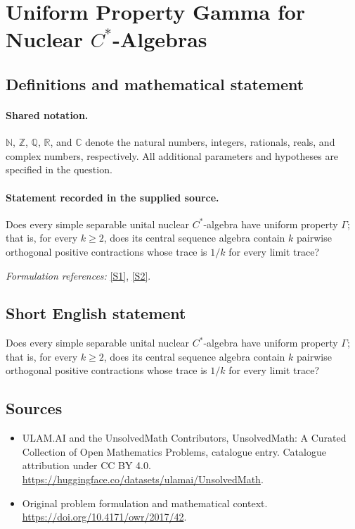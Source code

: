\documentclass[11pt]{article}
\newcommand{\sref}[2]{\hyperlink{source:#1:#2}{[S#2]}}
\begin{document}
\section{\texorpdfstring{Uniform Property Gamma for Nuclear $C^*$-Algebras}{Uniform Property Gamma for Nuclear C\textasciicircum{}*-Algebras}}\label{statement}

\subsection{Definitions and mathematical statement}

\paragraph{Shared notation.}$\mathbb N$, $\mathbb Z$, $\mathbb Q$, $\mathbb R$, and $\mathbb C$ denote the natural numbers, integers, rationals, reals, and complex numbers, respectively. All additional parameters and hypotheses are specified in the question.


\paragraph{Statement recorded in the supplied source.}
Does every simple separable unital nuclear $C^*$-algebra have uniform property $\Gamma$; that is, for every $k\geq2$, does its central sequence algebra contain $k$ pairwise orthogonal positive contractions whose trace is $1/k$ for every limit trace?
\par\smallskip\textit{Formulation references:} \sref{statement}{1}, \sref{statement}{2}.
\subsection{Short English statement}
Does every simple separable unital nuclear $C^*$-algebra have uniform property $\Gamma$; that is, for every $k\geq2$, does its central sequence algebra contain $k$ pairwise orthogonal positive contractions whose trace is $1/k$ for every limit trace?
\subsection{Sources}
\begin{itemize}
\item[\hypertarget{source:statement:1}{S1}] ULAM.AI and the UnsolvedMath Contributors, UnsolvedMath: A Curated Collection of Open Mathematics Problems, catalogue entry. Catalogue attribution under CC BY 4.0.
\url{https://huggingface.co/datasets/ulamai/UnsolvedMath}.
\item[\hypertarget{source:statement:2}{S2}] Original problem formulation and mathematical context.
\url{https://doi.org/10.4171/owr/2017/42}.
\end{itemize}
\label{end:statement}
\end{document}
